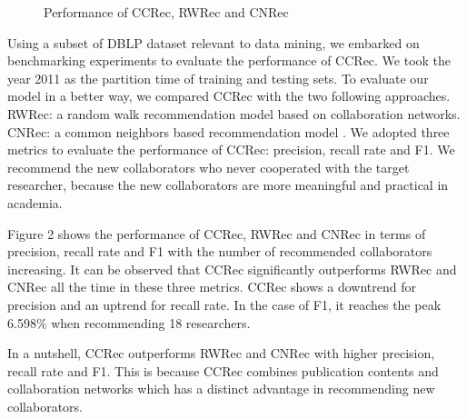 \documentclass{acm_proc_article-sp}
\begin{document}
\begin{figure}
\centering
{}
\caption{Performance of CCRec, RWRec and CNRec}
\label{fig:5}       %
\end{figure}
Using a subset of DBLP dataset relevant to data mining, we embarked on benchmarking experiments to evaluate the performance of CCRec. We took the year 2011 as the partition time of training and testing sets. To evaluate our model in a better way, we compared CCRec with the two following approaches. RWRec: a random walk recommendation model based on collaboration networks. CNRec: a common neighbors based recommendation model \cite{lopes2010collaboration}. We adopted three metrics to evaluate the performance of CCRec: precision, recall rate and F1. We recommend the new collaborators who never cooperated with the target researcher, because the new collaborators are more meaningful and practical in academia.

Figure 2 shows the performance of CCRec, RWRec and CNRec in terms of precision, recall rate and F1 with the number of recommended collaborators increasing. It can be observed that CCRec significantly outperforms RWRec and CNRec all the time in these three metrics. CCRec shows a downtrend for precision and an uptrend for recall rate. In the case of F1, it reaches the peak 6.598\% when recommending 18 researchers.

In a nutshell, CCRec outperforms RWRec and CNRec with higher precision, recall rate and F1. This is because CCRec combines publication contents and collaboration networks which has a distinct advantage in recommending new collaborators.
\end{document}
